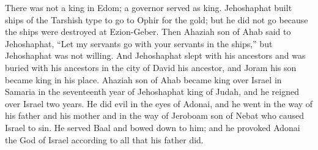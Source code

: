 \begin{biblechapter}
\verse There was not a king in Edom; a governor served as king.
\verse Jehoshaphat built ships of the Tarshish type to go to Ophir for the gold; but he did not go because the ships were destroyed at Ezion-Geber.
\verse Then Ahaziah son of Ahab said to Jehoshaphat, “Let my servants go with your servants in the ships,” but Jehoshaphat was not willing.
\verse And Jehoshaphat slept with his ancestors and was buried with his ancestors in the city of David his ancestor, and Joram his son became king in his place.
 Ahaziah son of Ahab became king over Israel in Samaria in the seventeenth year of Jehoshaphat king of Judah, and he reigned over Israel two years.
\verse He did evil in the eyes of Adonai, and he went in the way of his father and his mother and in the way of Jeroboam son of Nebat who caused Israel to sin.
\verse He served Baal and bowed down to him; and he provoked Adonai the God of Israel according to all that his father did.
\end{biblechapter}

